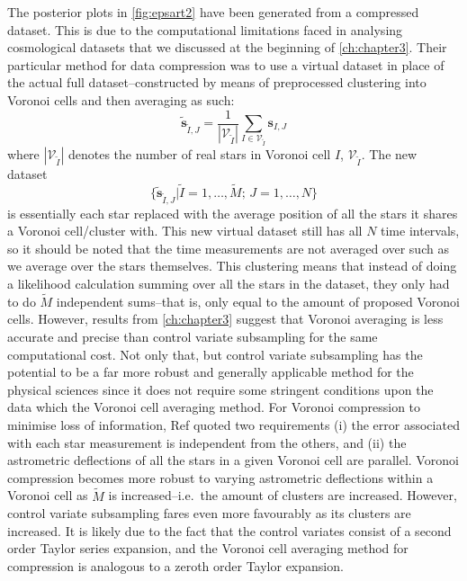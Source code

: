 The posterior plots in \cref{fig:epsart2} have been generated from a compressed dataset. This is due to the computational limitations faced in analysing cosmological datasets that we discussed at the beginning of \cref{ch:chapter3}. Their particular method for data compression was to use a virtual dataset in place of the actual full dataset--constructed by means of preprocessed clustering into Voronoi cells and then averaging as such:
%
\begin{equation}\label{eq:compression}
\tilde{\mathbf{s}}_{\tilde{I},J} = \frac{1}{\left|\mathcal{V}_{\tilde{I}}\right|}\sum_{I\in\mathcal{V}_{\tilde{I}}}\mathbf{s}_{I,J}
\end{equation} 
%
where $|\mathcal{V}_{\tilde{I}}|$ denotes the number of real stars in Voronoi cell $I$, $\mathcal{V}_{\tilde{I}}$. The new dataset 
\begin{equation}
    \{ \tilde{\mathbf{s}}_{\tilde{I},J} | \tilde{I}\!=\!1,\ldots,\tilde{M} ;\, J\!=\!1,\ldots,N\}
\end{equation}
is essentially each star replaced with the average position of all the stars it shares a Voronoi cell/cluster with. This new virtual dataset still has all $N$ time intervals, so it should be noted that the time measurements are not averaged over such as we average over the stars themselves. This clustering means that instead of doing a likelihood calculation summing over all the stars in the dataset, they only had to do $\tilde{M}$ independent sums--that is, only equal to the amount of proposed Voronoi cells. However, results from \cref{ch:chapter3} suggest that Voronoi averaging is less accurate and precise than control variate subsampling for the same computational cost. Not only that, but control variate subsampling has the potential to be a far more robust and generally applicable method for the physical sciences since it does not require some stringent conditions upon the data which the Voronoi cell averaging method. For Voronoi compression to minimise loss of information, Ref \cite{Mihaylov_2020} quoted two requirements (i) the error associated with each star measurement is independent from the others, and (ii) the astrometric deflections of all the stars in a given Voronoi cell are parallel. Voronoi compression becomes more robust to varying astrometric deflections within a Voronoi cell as $\tilde{M}$ is increased--i.e.\ the amount of clusters are increased. However, control variate subsampling fares even more favourably as its clusters are increased. It is likely due to the fact that the control variates consist of a second order Taylor series expansion, and the Voronoi cell averaging method for compression is analogous to a zeroth order Taylor expansion. %

